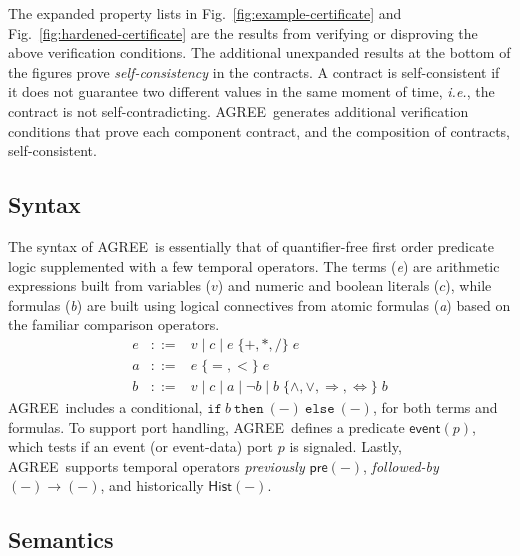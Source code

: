 \documentclass[global,twocolumn]{svjour}
\newcommand{\konst}[1]{\ensuremath{\mathsf{#1}}}
\newcommand{\imp}{\Rightarrow}
\newcommand{\set}[1]{\ensuremath{\{ {#1} \}}}
\newcommand{\itelse}[3]{\mbox{$\mathtt{if}\ {#1}\ \mathtt{then}\ {#2}\ \mathtt{else}\ {#3}$}}
\newcommand{\figref}[1]{Fig.~\ref{#1}}
\newcommand{\agr}{AGREE}
\newcommand{\ie}{\textit{i.e.}}
\begin{document}
The expanded property lists in \figref{fig:example-certificate} and \figref{fig:hardened-certificate} are the results from verifying or disproving the above verification conditions.
%
The additional unexpanded results at the bottom of the figures prove \emph{self-consistency} in the contracts.
%
A contract is self-consistent if it does not guarantee two different values in the same moment of time, \ie, the contract is not self-contradicting.
%
\agr\ generates additional verification conditions that prove each component contract, and the composition of contracts, self-consistent.


\subsection{Syntax}
\label{sec:agree-semantics}

The syntax of \agr\ is essentially that of quantifier-free first order predicate logic supplemented with a few temporal operators.
%
The terms (\emph{e}) are arithmetic expressions built from variables ($v$) and numeric and boolean literals ($c$), while formulas (\emph{b}) are built using logical connectives from atomic formulas (\emph{a}) based on the familiar comparison operators.
%
\[
\begin{array}{rcl}
e & ::= & v \mid c \mid e \;\set{+,*,/}\; e \\
a & ::= & e\; \set{=,<}\; e \\
b & ::= & v \mid c \mid a \mid \neg b
            \mid b \; \set{\land,\lor,\imp,\iff}\; b
\end{array}
\]
%
\agr\ includes a conditional, $\itelse{b}{(-)}{(-)}$, for both terms and formulas. To support port handling, \agr\ defines a predicate $\konst{event}(p)$, which tests if an event (or event-data) port $p$ is signaled.
%
Lastly, \agr\ supports temporal operators \emph{previously} $\konst{pre}(-)$, \emph{followed-by} $(-) \to (-)$, and historically $\konst{Hist}(-)$.


\subsection{Semantics}
\end{document}
